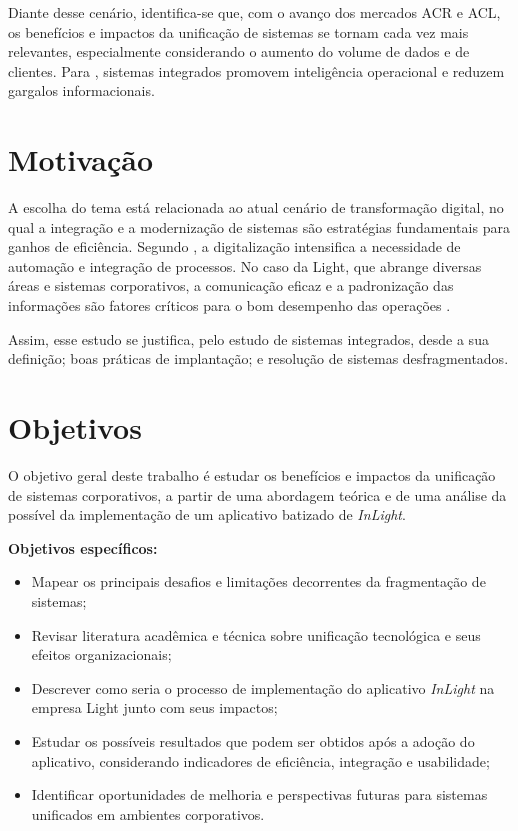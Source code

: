 Diante desse cenário, identifica-se que, com o avanço dos mercados ACR e ACL, os benefícios e impactos da unificação de sistemas se tornam cada vez mais relevantes, especialmente considerando o aumento do volume de dados e de clientes. Para \cite{davenport2018}, sistemas integrados promovem inteligência operacional e reduzem gargalos informacionais.

\section{Motivação}

A escolha do tema está relacionada ao atual cenário de transformação digital, no qual a integração e a modernização de sistemas são estratégias fundamentais para ganhos de eficiência. Segundo \cite{schwab2016}, a digitalização intensifica a necessidade de automação e integração de processos. No caso da Light, que abrange diversas áreas e sistemas corporativos, a comunicação eficaz e a padronização das informações são fatores críticos para o bom desempenho das operações \citep{laudon2020}.

Assim, esse estudo se justifica, pelo estudo de sistemas integrados, desde a sua definição; boas práticas de implantação; e resolução de sistemas desfragmentados.
\section{Objetivos}

O objetivo geral deste trabalho é estudar os benefícios e impactos da unificação de sistemas corporativos, a partir de uma abordagem teórica e de uma análise da possível da implementação de um aplicativo batizado de \textit{InLight}.

\textbf{Objetivos específicos:}
\begin{itemize}
    \item Mapear os principais desafios e limitações decorrentes da fragmentação de sistemas;
    \item Revisar literatura acadêmica e técnica sobre unificação tecnológica e seus efeitos organizacionais;
    \item Descrever como seria o processo de implementação do aplicativo \textit{InLight} na empresa Light junto com seus impactos;
    \item Estudar os possíveis resultados que podem ser obtidos após a adoção do aplicativo, considerando indicadores de eficiência, integração e usabilidade;
    \item Identificar oportunidades de melhoria e perspectivas futuras para sistemas unificados em ambientes corporativos.
\end{itemize}

